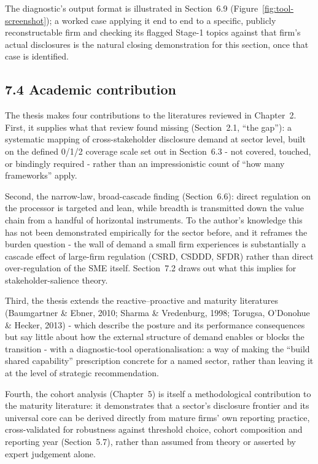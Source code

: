 \documentclass[
]{article}
\begin{document}
The diagnostic's output format is illustrated in Section~6.9
(Figure~\ref{fig:tool-screenshot}); a worked case applying it end to end to a
specific, publicly reconstructable firm and checking its flagged Stage-1
topics against that firm's actual disclosures is the natural closing
demonstration for this section, once that case is identified.

\subsection{7.4 Academic contribution}\label{discussion-academic}

The thesis makes four contributions to the literatures reviewed in
Chapter~2. First, it supplies what that review found missing (Section~2.1,
``the gap''): a systematic mapping of cross-stakeholder disclosure demand at
sector level, built on the defined 0/1/2 coverage scale set out in
Section~6.3 - not covered, touched, or bindingly required - rather than
an impressionistic count of ``how many frameworks'' apply.

Second, the narrow-law, broad-cascade finding (Section~6.6): direct regulation on
the processor is targeted and lean, while breadth is transmitted down the value
chain from a handful of horizontal instruments. To the author's knowledge this has
not been demonstrated empirically for the sector before, and it reframes the
burden question - the wall of demand a small firm experiences is substantially a
cascade effect of large-firm regulation (CSRD, CSDDD, SFDR) rather than direct
over-regulation of the SME itself. Section~7.2 draws out what this implies for
stakeholder-salience theory.

Third, the thesis extends the reactive--proactive and maturity literatures
(Baumgartner \& Ebner, 2010; Sharma \& Vredenburg, 1998; Torugsa, O'Donohue \&
Hecker, 2013) - which describe the posture and its performance consequences
but say little about how the external structure of demand enables or blocks
the transition - with a diagnostic-tool operationalisation: a way of making
the ``build shared capability'' prescription concrete for a named sector,
rather than leaving it at the level of strategic recommendation.

Fourth, the cohort analysis (Chapter~5) is itself a methodological
contribution to the maturity literature: it demonstrates that a sector's
disclosure frontier and its universal core can be derived directly from
mature firms' own reporting practice, cross-validated for robustness against
threshold choice, cohort composition and reporting year (Section~5.7), rather
than assumed from theory or asserted by expert judgement alone.
\end{document}
